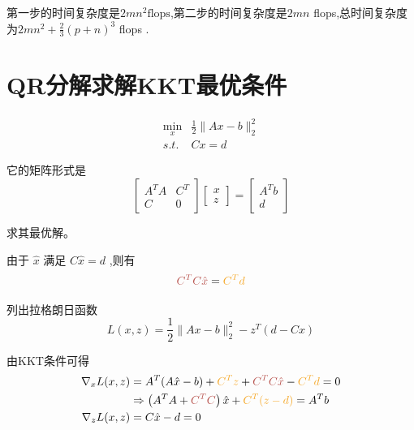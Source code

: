 第一步的时间复杂度是$2 m n^{2}  \text{flops} $,第二步的时间复杂度是$2 {mn} $ flops,总时间复杂度为$ 2 m n^{2}+\frac{2}{3}(p+n)^{3} $ flops .

\section{QR分解求解KKT最优条件}

\begin{problem}
    \begin{equation}\begin{aligned}
        \min _{x} & \frac{1}{2}\|A x-b\|_{2}^{2}\\
        s.t. & C x=d
    \end{aligned}\end{equation}

    它的矩阵形式是
    \begin{equation}
\left[\begin{array}{cc}
A^{T} A & C^{T} \\
C & 0
\end{array}\right]\left[\begin{array}{l}
x \\
z
\end{array}\right]=\left[\begin{array}{c}
A^{T} b \\
d
\end{array}\right]
\end{equation}

求其最优解。
\end{problem}


由于 $ \hat{x} $ 满足 $ C \hat{x}=d $ ,则有 \begin{equation}\displaystyle \textcolor[rgb]{0.72,0.33,0.31}{C^{T} C\hat{x}} =\textcolor[rgb]{0.96,0.65,0.14}{C^{T} d}\end{equation} 

列出拉格朗日函数
\begin{equation}
L(x, z)=\frac{1}{2}\|A x-b\|_{2}^{2}-z^{T}(d-C x)
\end{equation}

由KKT条件可得
\begin{equation}\begin{aligned}
    \nabla _{x} L(x,z) & =A^{T} (A\hat{x} -b)+\textcolor[rgb]{0.96,0.65,0.14}{C^{T} z} +\textcolor[rgb]{0.72,0.33,0.31}{C^{T} C\hat{x}} -\textcolor[rgb]{0.96,0.65,0.14}{C^{T} d} =0\\
     & \Rightarrow \left( A^{T} A+\textcolor[rgb]{0.72,0.33,0.31}{C^{T} C}\right)\hat{x} +\textcolor[rgb]{0.96,0.65,0.14}{C^{T} (z-d)} =A^{T} b\\
    \nabla _{z} L(x,z) & =C\hat{x} -d=0
    \end{aligned}
\end{equation}


